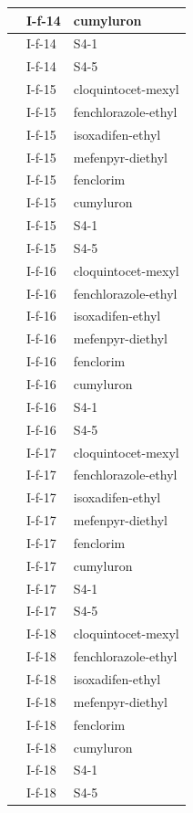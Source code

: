 \documentclass[11pt,a4paper]{article}
\begin{document}
\begin{table}[h]
\begin{tabular}{|l|l|l|}
 & I-f-14 & cumyluron \\ \hline
 & I-f-14 & S4-1 \\ \hline
 & I-f-14 & S4-5 \\ \hline
 & I-f-15 & cloquintocet-mexyl \\ \hline
 & I-f-15 & fenchlorazole-ethyl \\ \hline
 & I-f-15 & isoxadifen-ethyl \\ \hline
 & I-f-15 & mefenpyr-diethyl \\ \hline
 & I-f-15 & fenclorim \\ \hline
 & I-f-15 & cumyluron \\ \hline
 & I-f-15 & S4-1 \\ \hline
 & I-f-15 & S4-5 \\ \hline
 & I-f-16 & cloquintocet-mexyl \\ \hline
 & I-f-16 & fenchlorazole-ethyl \\ \hline
 & I-f-16 & isoxadifen-ethyl \\ \hline
 & I-f-16 & mefenpyr-diethyl \\ \hline
 & I-f-16 & fenclorim \\ \hline
 & I-f-16 & cumyluron \\ \hline
 & I-f-16 & S4-1 \\ \hline
 & I-f-16 & S4-5 \\ \hline
 & I-f-17 & cloquintocet-mexyl \\ \hline
 & I-f-17 & fenchlorazole-ethyl \\ \hline
 & I-f-17 & isoxadifen-ethyl \\ \hline
 & I-f-17 & mefenpyr-diethyl \\ \hline
 & I-f-17 & fenclorim \\ \hline
 & I-f-17 & cumyluron \\ \hline
 & I-f-17 & S4-1 \\ \hline
 & I-f-17 & S4-5 \\ \hline
 & I-f-18 & cloquintocet-mexyl \\ \hline
 & I-f-18 & fenchlorazole-ethyl \\ \hline
 & I-f-18 & isoxadifen-ethyl \\ \hline
 & I-f-18 & mefenpyr-diethyl \\ \hline
 & I-f-18 & fenclorim \\ \hline
 & I-f-18 & cumyluron \\ \hline
 & I-f-18 & S4-1 \\ \hline
 & I-f-18 & S4-5 \\ \hline

\end{tabular}
\end{table}
\end{document}
